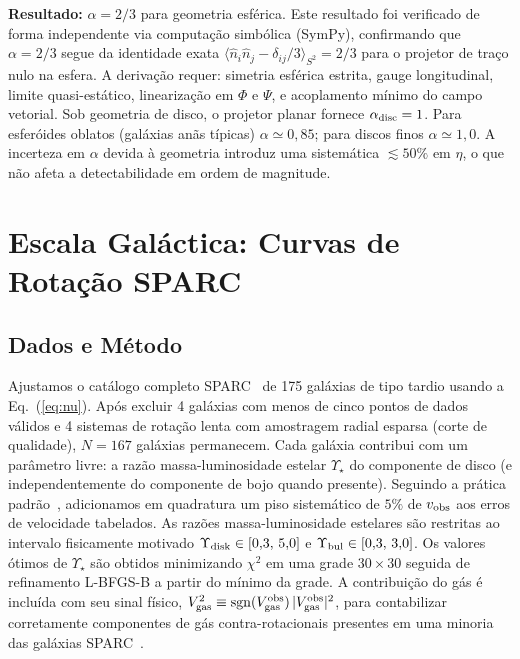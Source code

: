 \documentclass[aps,prd,twocolumn,showpacs,superscriptaddress]{revtex4-2}
\begin{document}
\textbf{Resultado:} $\alpha = 2/3$ para geometria esférica.
Este resultado foi verificado de forma independente via computação
simbólica (SymPy), confirmando que $\alpha = 2/3$ segue da
identidade exata $\langle \hat{n}_i\hat{n}_j - \delta_{ij}/3
\rangle_{S^2} = 2/3$ para o projetor de traço nulo na esfera.
A derivação requer: simetria esférica estrita, gauge longitudinal,
limite quasi-estático, linearização em $\Phi$ e $\Psi$, e
acoplamento mínimo do campo vetorial.
Sob geometria de disco, o projetor planar fornece $\alpha_{\rm disc} = 1$.
Para esferóides oblatos (galáxias anãs típicas) $\alpha \simeq 0{,}85$;
para discos finos $\alpha \simeq 1{,}0$.
A incerteza em $\alpha$ devida à geometria introduz uma sistemática
$\lesssim 50\%$ em $\eta$, o que não afeta a detectabilidade em
ordem de magnitude.

\section{Escala Galáctica: Curvas de Rotação SPARC}
\label{sec:sparc}

\subsection{Dados e Método}

Ajustamos o catálogo completo SPARC~\cite{Lelli2016} de 175
galáxias de tipo tardio usando a Eq.~(\ref{eq:nu}).
Após excluir 4 galáxias com menos de cinco pontos de dados
válidos e 4 sistemas de rotação lenta com amostragem radial
esparsa (corte de qualidade), $N=167$ galáxias permanecem.
Cada galáxia contribui com um parâmetro livre: a razão
massa-luminosidade estelar $\Upsilon_\star$ do componente de
disco (e independentemente do componente de bojo quando presente).
Seguindo a prática padrão~\cite{Li2018}, adicionamos em quadratura
um piso sistemático de $5\%$ de $v_{\rm obs}$ aos erros de
velocidade tabelados.
As razões massa-luminosidade estelares são restritas ao intervalo
fisicamente motivado $\Upsilon_{\rm disk} \in [0{,}3,\,5{,}0]$ e
$\Upsilon_{\rm bul} \in [0{,}3,\,3{,}0]$.
Os valores ótimos de $\Upsilon_\star$ são obtidos minimizando
$\chi^2$ em uma grade $30\times30$ seguida de refinamento L-BFGS-B
a partir do mínimo da grade.
A contribuição do gás é incluída com seu sinal físico,
$V_{\rm gas}^2 \equiv {\rm sgn}(V_{\rm gas}^{\rm obs})\,
|V_{\rm gas}^{\rm obs}|^2$, para contabilizar corretamente
componentes de gás contra-rotacionais presentes em uma minoria
das galáxias SPARC~\cite{Oman2015}.
\end{document}
